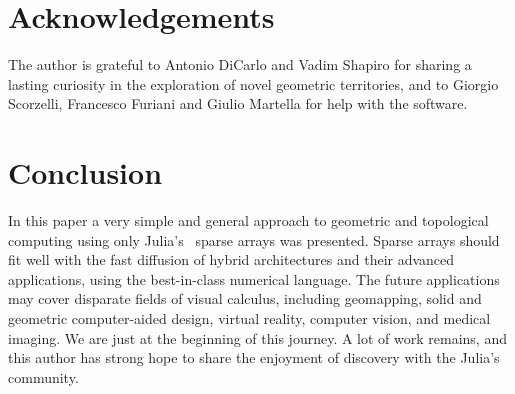 \documentclass{juliacon}
\begin{document}
\section*{Acknowledgements}
The author is grateful to Antonio DiCarlo and Vadim Shapiro for sharing a lasting curiosity in the exploration of novel geometric territories, and to Giorgio Scorzelli, Francesco Furiani and Giulio Martella for help with the software.

\section{Conclusion}
In this paper a very simple and general approach to geometric and topological computing using only Julia's~\cite{bezanson2017julia} sparse arrays was presented. Sparse arrays should fit well with the fast diffusion of hybrid architectures and their advanced applications, using the best-in-class numerical language. The future applications may cover disparate fields of visual calculus, including geomapping, solid and geometric computer-aided design, virtual reality, computer vision, and medical imaging.  
We are just at the beginning of this journey. A lot of work remains, and this author has strong hope to share the enjoyment of discovery with the Julia's community.



\scriptsize



%
\end{document}
